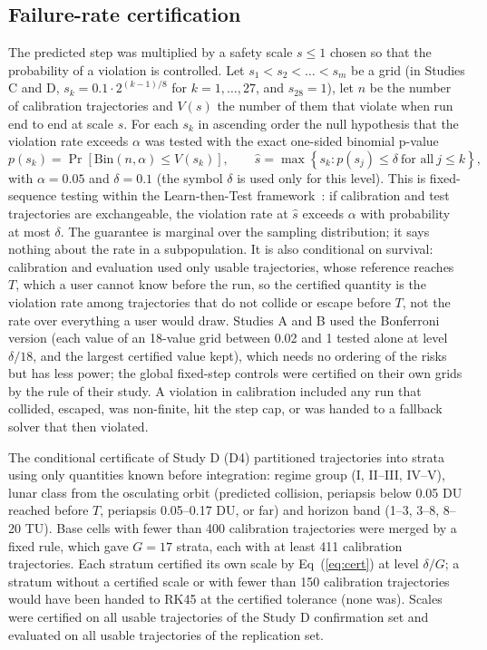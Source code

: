 \documentclass[10pt,letterpaper]{article}
\begin{document}
\subsection*{Failure-rate certification}
The predicted step was multiplied by a safety scale $s \le 1$ chosen so that the probability of a violation is controlled. Let $s_{1} < s_{2} < \dots < s_{m}$ be a grid (in Studies C and D, $s_{k} = 0.1\cdot2^{(k-1)/8}$ for $k = 1,\dots,27$, and $s_{28} = 1$), let $n$ be the number of calibration trajectories and $V(s)$ the number of them that violate when run end to end at scale $s$. For each $s_{k}$ in ascending order the null hypothesis that the violation rate exceeds $\alpha$ was tested with the exact one-sided binomial p-value
\begin{equation}
\label{eq:cert}
p(s_{k}) = \Pr\left[\mathrm{Bin}(n,\alpha) \le V(s_{k})\right],
\qquad
\hat{s} = \max\left\{ s_{k} : p(s_{j}) \le \delta \ \text{for all}\ j \le k \right\},
\end{equation}
with $\alpha = 0.05$ and $\delta = 0.1$ (the symbol $\delta$ is used only for this level). This is fixed-sequence testing within the Learn-then-Test framework~\cite{angelopoulos2025}: if calibration and test trajectories are exchangeable, the violation rate at $\hat{s}$ exceeds $\alpha$ with probability at most $\delta$. The guarantee is marginal over the sampling distribution; it says nothing about the rate in a subpopulation. It is also conditional on survival: calibration and evaluation used only usable trajectories, whose reference reaches $T$, which a user cannot know before the run, so the certified quantity is the violation rate among trajectories that do not collide or escape before $T$, not the rate over everything a user would draw. Studies A and B used the Bonferroni version (each value of an 18-value grid between 0.02 and 1 tested alone at level $\delta/18$, and the largest certified value kept), which needs no ordering of the risks but has less power; the global fixed-step controls were certified on their own grids by the rule of their study. A violation in calibration included any run that collided, escaped, was non-finite, hit the step cap, or was handed to a fallback solver that then violated.

The conditional certificate of Study D (D4) partitioned trajectories into strata using only quantities known before integration: regime group (I, II--III, IV--V), lunar class from the osculating orbit (predicted collision, periapsis below 0.05 DU reached before $T$, periapsis 0.05--0.17 DU, or far) and horizon band (1--3, 3--8, 8--20 TU). Base cells with fewer than 400 calibration trajectories were merged by a fixed rule, which gave $G = 17$ strata, each with at least 411 calibration trajectories. Each stratum certified its own scale by Eq~(\ref{eq:cert}) at level $\delta/G$; a stratum without a certified scale or with fewer than 150 calibration trajectories would have been handed to RK45 at the certified tolerance (none was). Scales were certified on all usable trajectories of the Study D confirmation set and evaluated on all usable trajectories of the replication set.
\end{document}
